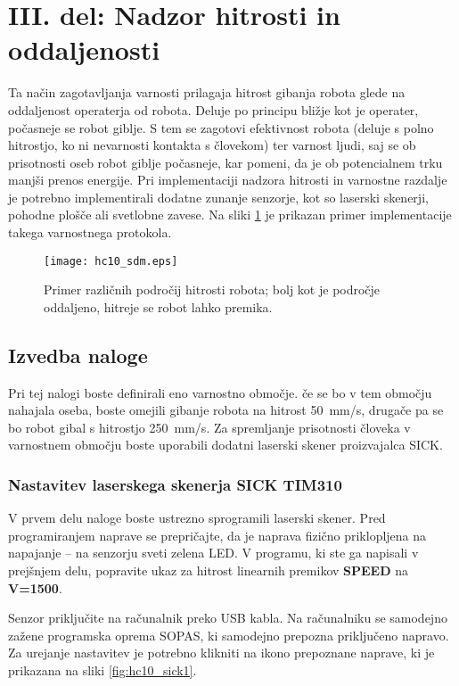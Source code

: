 \section{III. del: Nadzor hitrosti in oddaljenosti}

Ta način zagotavljanja varnosti prilagaja hitrost gibanja robota glede na oddaljenost operaterja od robota. Deluje po principu bližje kot je operater, počasneje se robot giblje. S tem se zagotovi efektivnost robota (deluje s polno hitrostjo, ko ni nevarnosti kontakta s človekom) ter varnost ljudi, saj se ob prisotnosti oseb robot giblje počasneje, kar pomeni, da je ob potencialnem trku manjši prenos energije. Pri implementaciji nadzora hitrosti in varnostne razdalje je potrebno implementirali dodatne zunanje senzorje, kot so laserski skenerji, pohodne plošče ali svetlobne zavese. Na sliki \ref{fig:hc10_sdm} je prikazan primer implementacije takega varnostnega protokola.

\begin{figure}[!hbt]
	\centering
	\texttt{[image: hc10\_sdm.eps]}
	\caption{Primer različnih področij hitrosti robota; bolj kot je področje oddaljeno, hitreje se robot lahko premika.}
	\label{fig:hc10_sdm}
\end{figure}

\subsection*{Izvedba naloge}

Pri tej nalogi boste definirali eno varnostno območje. če se bo v tem območju nahajala oseba, boste omejili gibanje robota na hitrost 50~mm/s, drugače pa se bo robot gibal s hitrostjo 250~mm/s. Za spremljanje prisotnosti človeka v varnostnem območju boste uporabili dodatni laserski skener proizvajalca SICK.

\subsubsection*{Nastavitev laserskega skenerja SICK TIM310}

V prvem delu naloge boste ustrezno sprogramili laserski skener. Pred programiranjem naprave se prepričajte, da je naprava fizično priklopljena na napajanje -- na senzorju sveti zelena LED. V programu, ki ste ga napisali v prejšnjem delu, popravite ukaz za hitrost linearnih premikov \textbf{SPEED} na \textbf{V=1500}.

Senzor priključite na računalnik preko USB kabla. Na računalniku se samodejno zažene programska oprema SOPAS, ki samodejno prepozna priključeno napravo. Za urejanje nastavitev je potrebno klikniti na ikono prepoznane naprave, ki je prikazana na sliki \ref{fig:hc10_sick1}.

